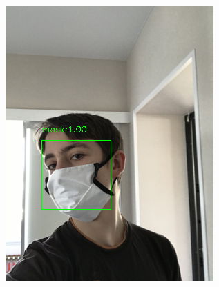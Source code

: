 \documentclass[10pt,a4paper]{report}
\begin{document}
\begin{figure}[hbtp]
\begin{subfigure}[b]{0.45\textwidth}
         \centering
         \includegraphics[width=\textwidth]{./imgs/good/maksssksksss765.png}
     \end{subfigure}
               \hfill
     \begin{subfigure}[b]{0.45\textwidth}
         \centering

\end{subfigure}
\end{figure}
\end{document}
